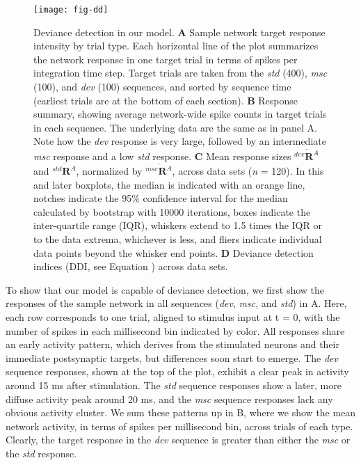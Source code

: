 \documentclass[9pt,lineno,onehalfspacing]{elife}
\newcommand{\dev}{\textit{dev}}
\newcommand{\msc}{\textit{msc}}
\newcommand{\std}{\textit{std}}
\newcommand{\R}[3][]{{}^{#1}_{}\boldsymbol R^{#2}_{#3}}
\newcommand{\mean}[1]{\overline{#1}}
\begin{document}
\begin{figure}
    \texttt{[image: fig-dd]}
    \caption{%
        Deviance detection in our model.
        \textbf{A} Sample network target response intensity by trial type. Each horizontal line of the plot summarizes the network response in one target trial in terms of spikes per integration time step. Target trials are taken from the \std{} (400), \msc{} (100), and \dev{} (100) sequences, and sorted by sequence time (earliest trials are at the bottom of each section).
        \textbf{B} Response summary, showing average network-wide spike counts in target trials in each sequence. The underlying data are the same as in panel A. Note how the \dev{} response is very large, followed by an intermediate \msc{} response and a low \std{} response.
        \textbf{C} Mean response sizes $\mean{\R[dev]{A}{}}$ and $\mean{\R[std]{A}{}}$, normalized by $\mean{\R[msc]{A}{}}$, across data sets (\textit{n} = 120). In this and later boxplots, the median is indicated with an orange line, notches indicate the 95\% confidence interval for the median calculated by bootstrap with 10000 iterations, boxes indicate the inter-quartile range (IQR), whiskers extend to 1.5 times the IQR or to the data extrema, whichever is less, and fliers indicate individual data points beyond the whisker end points.
        \textbf{D} Deviance detection indices (DDI, see Equation ) across data sets.
    }
    \label{fig:DD}
\end{figure}

To show that our model is capable of deviance detection, we first show the responses of the sample network in all sequences (\dev{}, \msc{}, and \std{}) in A. Here, each row corresponds to one trial, aligned to stimulus input at t = 0, with the number of spikes in each millisecond bin indicated by color. All responses share an early activity pattern, which derives from the stimulated neurons and their immediate postsynaptic targets, but differences soon start to emerge. The \dev{} sequence responses, shown at the top of the plot, exhibit a clear peak in activity around 15 ms after stimulation. The \std{} sequence responses show a later, more diffuse activity peak around 20 ms, and the \msc{} sequence responses lack any obvious activity cluster. We sum these patterns up in B, where we show the mean network activity, in terms of spikes per millisecond bin, across trials of each type. Clearly, the target response in the \dev{} sequence is greater than either the \msc{} or the \std{} response.
\end{document}
